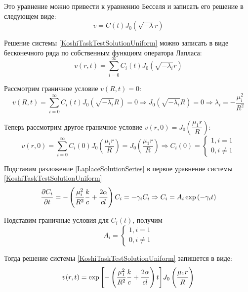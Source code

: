 \documentclass[a4paper,12pt,russian, fleqn]{extreport}
\begin{document}
	Это уравнение можно привести к уравнению Бесселя и записать его решение в следующем виде:
	\begin{equation*}
		v = C(t)J_0\left( \sqrt{-\lambda}r \right)
	\end{equation*}
	
	Решение системы \eqref{KoshiTaskTestSolutionUniform} можно записать в виде бесконечного ряда по собственным функциям оператора Лапласа:
	\begin{equation}\label{LaplaceSolutionSeries}
		v(r,t) = \sum\limits^{\infty}_{i=0} C_i(t)J_0\left(\sqrt{-\lambda_i}r\right)
	\end{equation}
	
	Рассмотрим граничное условие $v(R,t) = 0$:
	\begin{equation*}
		v(R,t) = \sum\limits^{\infty}_{i=0} C_i(t)J_0\left(\sqrt{-\lambda_i}R\right) = 0 \Rightarrow J_0\left(\sqrt{-\lambda_i}R\right) = 0 \Rightarrow \lambda_i = -\dfrac{\mu_i^2}{R^2}
	\end{equation*}
	
	Теперь рассмотрим другое граничное условие $v(r,0) = J_0\left(\dfrac{\mu_1 r}{R}\right)$:
	\begin{equation*}
		v(r,0) = \sum\limits^{\infty}_{i=0} C_i(0)J_0\left(\dfrac{\mu_i r}{R}\right) = J_0\left(\dfrac{\mu_1 r}{R}\right) \Rightarrow C_i(0) = \left\{\begin{array}{c}
			1, i = 1 \\
			0, i \ne 1
		\end{array}\right.
	\end{equation*}
	
	Подставим разложение \eqref{LaplaceSolutionSeries} в первое уравнение системы \eqref{KoshiTaskTestSolutionUniform}
	\begin{equation*}\label{key}
	\dfrac{\strut \partial C_i}{\strut \partial t} = - \left ( \dfrac{\strut \mu_i^2}{\strut R^2}\dfrac{\strut k}{\strut c} + \dfrac{\strut 2\alpha}{\strut cl} \right) C_i = -\gamma_i C_i \Rightarrow C_i = A_i \exp{\left( -\gamma_i t \right)}
	\end{equation*}
	
	Подставим граничные условия для $C_i(t)$, получим
	\begin{equation*}
		A_i = \left\{\begin{array}{c}
		1, i = 1 \\
		0, i \ne 1
		\end{array}\right.
	\end{equation*}
	
	Тогда решение системы \eqref{KoshiTaskTestSolutionUniform} запишется в виде:
	\begin{equation*}
		v(r,t) = \exp{\left[ - \left ( \dfrac{\strut \mu_1^2}{\strut R^2}\dfrac{\strut k}{\strut c} + \dfrac{\strut 2\alpha}{\strut cl} \right)t \right]}J_0 \left( \dfrac{\strut \mu_1 r}{\strut R}\right)
	\end{equation*}
	
\end{document}
